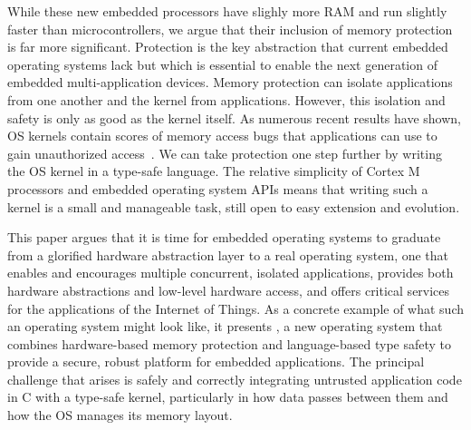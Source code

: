 While these new embedded processors have slighly more RAM and run slightly
faster than microcontrollers, we argue that their inclusion of memory 
protection is far more significant. Protection is the key abstraction that 
current embedded operating
systems lack but which is essential to enable the next generation
of embedded multi-application devices. Memory protection can isolate 
applications from one another and the kernel from applications. However,
this isolation and safety is only as good as the kernel itself. As numerous
recent results have shown, OS kernels contain scores of memory access
bugs that 
applications can use to gain unauthorized access~\cite{nickolai}. We can
take protection one step further by writing the OS kernel in a type-safe
language.  The
relative simplicity of Cortex M processors and embedded operating system
APIs means that writing such a kernel is a small and manageable task,
still open to easy extension and evolution.

This paper argues that it is time for embedded operating systems to graduate 
from  a glorified 
hardware abstraction layer to a real operating system, 
one that enables and encourages multiple concurrent, isolated applications,
provides both hardware abstractions and low-level hardware access, and offers
critical services for the applications of the Internet of Things.
As a concrete example of what such an operating system might look like,
it presents \name, a new operating system that combines hardware-based
memory protection and language-based type safety to provide a secure,
robust platform for embedded applications. The principal challenge that
arises is safely and correctly integrating untrusted
application code in C with a type-safe kernel, particularly in
how data passes between them and how the OS manages its memory layout.
